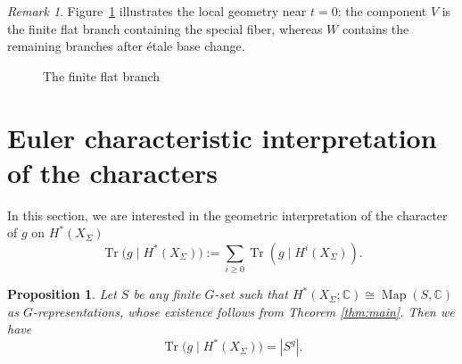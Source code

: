 \documentclass[12pt]{amsart}
\newtheorem{prop}[theorem]{Proposition}
\theoremstyle{remark}
\newtheorem{remark}[theorem]{Remark}
\begin{document}
\begin{remark}
Figure~\ref{fig:finite-branch} illustrates the local geometry near $t=0$:
the component $V$ is the finite flat branch containing the special fiber,
whereas $W$ contains the remaining branches after \'etale base
change.
\begin{figure}[ht]
\centering
{}
\caption{The finite flat branch}
\label{fig:finite-branch}
\end{figure}
\end{remark}

\section{Euler characteristic interpretation of the characters} \label{sec:4}

In this section, we are interested in the geometric interpretation of the character of $g$ on $H^{*}(X_\Sigma)$
$$
\operatorname{Tr}\big(g\mid H^{*}(X_\Sigma)\big)
:=\sum_{i\geq 0}\operatorname{Tr}(g\mid H^{i}(X_\Sigma)).$$

\begin{prop}
Let $S$ be any finite $G$-set such that \(H^*(X_\Sigma;\mathbb{C})\cong\operatorname{Map}(S,\mathbb{C})\)
as \(G\)-representations, whose existence follows from Theorem \ref{thm:main}. Then we have 
$$
\operatorname{Tr}\big(g\mid H^{*}(X_\Sigma)\big)
=|S^g|.$$
\end{prop}
\end{document}
